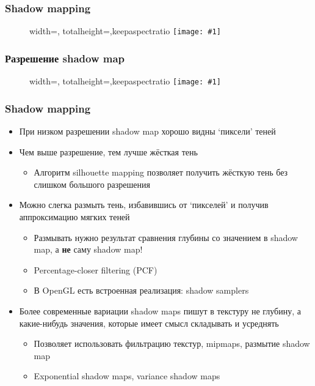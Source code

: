 \documentclass[10pt]{beamer}
\newcommand{\slideimage}[1]{
  \begin{figure}
    \begin{adjustbox}{width=\textwidth, totalheight=\textheight-2\baselineskip-2\baselineskip,keepaspectratio}
      \texttt{[image: \#1]}
    \end{adjustbox}
  \end{figure}
}
\begin{document}
\begin{frame}[fragile]
\frametitle{Shadow mapping}
\slideimage{shadow-mapping3.png}
\end{frame}

\begin{frame}[fragile]
\frametitle{Разрешение shadow map}
\slideimage{shadow-map-resolution.png}
\end{frame}

\begin{frame}[fragile]
\frametitle{Shadow mapping}
\fontsize{10pt}{10pt}
\begin{itemize}
\item При низком разрешении shadow map хорошо видны `пиксели' теней
\pause
\item Чем выше разрешение, тем лучше жёсткая тень
\pause
\begin{itemize}
\item Алгоритм silhouette mapping позволяет получить жёсткую тень без слишком большого разрешения
\end{itemize}
\pause
\item Можно слегка размыть тень, избавившись от `пикселей' и получив аппроксимацию мягких теней
\pause
\begin{itemize}
\item Размывать нужно результат сравнения глубины со значением в shadow map, а \textbf{не} саму shadow map!
\pause
\item Percentage-closer filtering (PCF)
\pause
\item В OpenGL есть встроенная реализация: shadow samplers
\end{itemize}
\pause
\item Более современные вариации shadow maps пишут в текстуру не глубину, а какие-нибудь значения, которые имеет смысл складывать и усреднять
\pause
\begin{itemize}
\item Позволяет использовать фильтрацию текстур, mipmaps, размытие shadow map
\pause
\item Exponential shadow maps, variance shadow maps
\end{itemize}
\end{itemize}
\end{frame}
\end{document}
